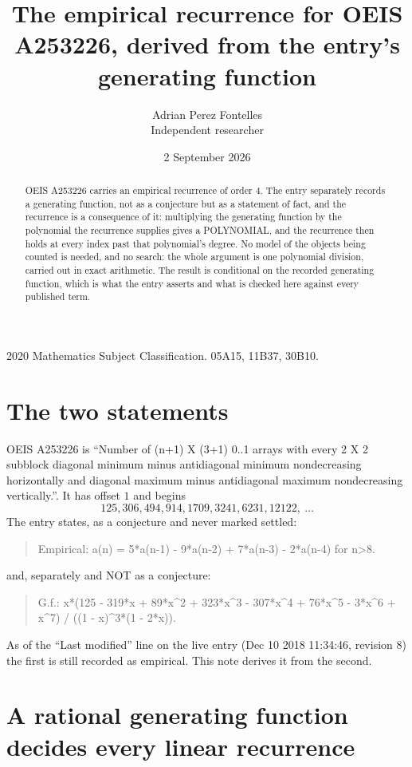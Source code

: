 \documentclass[11pt,a4paper]{article}
\title{The empirical recurrence for OEIS A253226, derived from the entry's generating function}
\author{Adrian Perez Fontelles\\ \small Independent researcher}
\date{2 September 2026}
\theoremstyle{plain}
\theoremstyle{definition}
\begin{document}
\maketitle

\begin{abstract}
OEIS A253226 carries an empirical recurrence of order $4$. The entry separately records a
generating function, not as a conjecture but as a statement of fact, and the recurrence is a
consequence of it: multiplying the generating function by the polynomial the recurrence
supplies gives a POLYNOMIAL, and the recurrence then holds at every index past that
polynomial's degree. No model of the objects being counted is needed, and no search: the
whole argument is one polynomial division, carried out in exact arithmetic. The result is
conditional on the recorded generating function, which is what the entry asserts and what is
checked here against every published term.
\end{abstract}

\noindent\small 2020 Mathematics Subject Classification. 05A15, 11B37, 30B10.\normalsize

\section{The two statements}

OEIS A253226 is ``Number of (n+1) X (3+1) 0..1 arrays with every 2 X 2 subblock diagonal minimum minus antidiagonal minimum nondecreasing horizontally and diagonal maximum minus antidiagonal maximum nondecreasing vertically.''. It has offset $1$ and begins
\[
125, 306, 494, 914, 1709, 3241, 6231, 12122,\ \dots
\]
The entry states, as a conjecture and never marked settled:
\begin{quote}
Empirical: a(n) = 5*a(n-1) - 9*a(n-2) + 7*a(n-3) - 2*a(n-4) for n>8.
\end{quote}
and, separately and NOT as a conjecture:
\begin{quote}
G.f.: x*(125 - 319*x + 89*x\^{}2 + 323*x\^{}3 - 307*x\^{}4 + 76*x\^{}5 - 3*x\^{}6 + x\^{}7) / ((1 - x)\^{}3*(1 - 2*x)).
\end{quote}
As of the ``Last modified'' line on the live entry (Dec 10 2018 11:34:46, revision 8) the first is still
recorded as empirical. This note derives it from the second.

\section{A rational generating function decides every linear recurrence}
\end{document}
